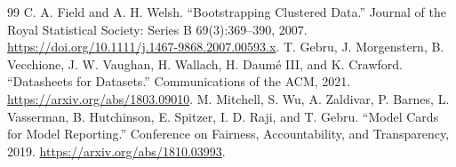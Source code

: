 \documentclass[11pt]{article}
\begin{document}
\begin{thebibliography}{99}
 C. A. Field and A. H. Welsh. ``Bootstrapping Clustered Data.'' Journal of the Royal Statistical Society: Series B 69(3):369--390, 2007. \url{https://doi.org/10.1111/j.1467-9868.2007.00593.x}.
 T. Gebru, J. Morgenstern, B. Vecchione, J. W. Vaughan, H. Wallach, H. Daum\'e III, and K. Crawford. ``Datasheets for Datasets.'' Communications of the ACM, 2021. \url{https://arxiv.org/abs/1803.09010}.
 M. Mitchell, S. Wu, A. Zaldivar, P. Barnes, L. Vasserman, B. Hutchinson, E. Spitzer, I. D. Raji, and T. Gebru. ``Model Cards for Model Reporting.'' Conference on Fairness, Accountability, and Transparency, 2019. \url{https://arxiv.org/abs/1810.03993}.
\end{thebibliography}
\end{document}
